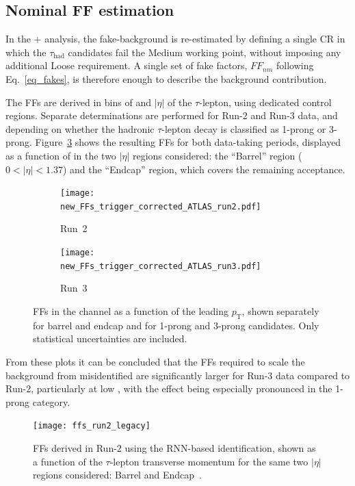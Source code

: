 \subsection{Nominal FF estimation}

In the \thqb + \ttH analysis, the fake-\tauhad background is re-estimated by defining a single CR in which the $\tau_{\mathrm{had}}$ candidates fail the Medium working point, without imposing any additional Loose requirement. A single set of fake factors, $FF_{nm}$ following Eq.~\ref{eq_fakes}, is therefore enough to describe the background contribution. 

The FFs are derived in bins of \pt and $|\eta|$ of the $\tau$-lepton, using dedicated \taulephad control regions. Separate determinations are performed for Run-2 and Run-3 data, and depending on whether the hadronic $\tau$-lepton decay is classified as 1-prong or 3-prong. Figure~\ref{fig:ff_run2_run3} shows the resulting FFs for both data-taking periods, displayed as a function of \pt in the two $|\eta|$ regions considered: the ``Barrel'' region ($0<|\eta|<1.37$) and the ``Endcap'' region, which covers the remaining acceptance.
\begin{figure}[htbp]
    \centering
    \begin{subfigure}[b]{0.49\textwidth}
      \centering
      \texttt{[image: new\_FFs\_trigger\_corrected\_ATLAS\_run2.pdf]}
      \caption{Run~2}
      \label{fig:ff_run2}
    \end{subfigure}
    \hfill
    \begin{subfigure}[b]{0.49\textwidth}
      \centering
      \texttt{[image: new\_FFs\_trigger\_corrected\_ATLAS\_run3.pdf]}
      \caption{Run~3}
      \label{fig:ff_run3}
    \end{subfigure}
    \caption{
      FFs in the \tauhadhad channel as a function of the leading $p_{\mathrm{T}}$,
      shown separately for barrel and endcap and for 1-prong and 3-prong candidates. Only statistical uncertainties are included.
    }
    \label{fig:ff_run2_run3}
  \end{figure}
From these plots it can be concluded that the FFs required to scale the background from misidentified \tauhad are significantly larger for Run-3 data compared to Run-2, particularly at low \pt, with the effect being especially pronounced in the 1-prong category. 
  \begin{figure}[htbp]
    \centering
    \texttt{[image: ffs\_run2\_legacy]}
    \caption{FFs derived in Run-2 using the RNN-based \tauhad identification, 
    shown as a function of the $\tau$-lepton transverse momentum for the same two $|\eta|$ regions considered: Barrel and Endcap~\cite{serhat_tesis}.}
    \label{fig:ffs_run2_rnn}
  \end{figure}

